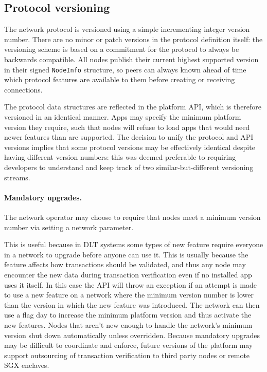 \documentclass{article}
\begin{document}
\subsection{Protocol versioning}\label{subsec:protocol-versioning}

The network protocol is versioned using a simple incrementing integer version number. There are no minor or patch
versions in the protocol definition itself: the versioning scheme is based on a commitment for the protocol
to always be backwards compatible. All nodes publish their current highest supported version in their signed
\texttt{NodeInfo} structure, so peers can always known ahead of time which protocol features are available to them
before creating or receiving connections.

The protocol data structures are reflected in the platform API, which is therefore versioned in an identical
manner. Apps may specify the minimum platform version they require, such that nodes will refuse to load apps that
would need newer features than are supported. The decision to unify the protocol and API versions implies that some
protocol versions may be effectively identical despite having different version numbers: this was deemed preferable
to requiring developers to understand and keep track of two similar-but-different versioning streams.

\paragraph{Mandatory upgrades.}The network operator may choose to require that nodes meet a minimum version number
via setting a network parameter.

This is useful because in DLT systems some types of new feature require everyone in a network to upgrade before
anyone can use it. This is usually because the feature affects how transactions should be validated, and thus any
node may encounter the new data during transaction verification even if no installed app uses it itself. In this
case the API will throw an exception if an attempt is made to use a new feature on a network where the minimum
version number is lower than the version in which the new feature was introduced. The network can then use a flag
day to increase the minimum platform version and thus activate the new features. Nodes that aren't new
enough to handle the network's minimum version shut down automatically unless overridden. Because mandatory
upgrades may be difficult to coordinate and enforce, future versions of the platform may support outsourcing of
transaction verification to third party nodes or remote SGX enclaves.
\end{document}
